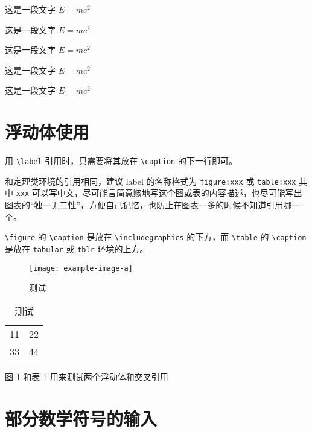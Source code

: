 \begin{antiexample}
  这是一段文字 $E = m c^2$
\end{antiexample}

\begin{conjecture}
  这是一段文字 $E = m c^2$
\end{conjecture}

\begin{question}
  这是一段文字 $E = m c^2$
\end{question}

\begin{claim}
  这是一段文字 $E = m c^2$
\end{claim}

\begin{remark}
  这是一段文字 $E = m c^2$
\end{remark}



\section{浮动体使用}

用 \verb|\label| 引用时，只需要将其放在 \verb|\caption| 的下一行即可。

和定理类环境的引用相同，建议 label 的名称格式为 \verb|figure:xxx| 或 \verb|table:xxx| 其中 \verb|xxx| 可以写中文，尽可能言简意赅地写这个图或表的内容描述，也尽可能写出图表的“独一无二性”，方便自己记忆，也防止在图表一多的时候不知道引用哪一个。

\verb|\figure| 的 \verb|\caption| 是放在 \verb|\includegraphics| 的下方，而 \verb|\table| 的 \verb|\caption| 是放在 \verb|tabular| 或 \verb|tblr| 环境的上方。

\begin{figure}[htbp]
  \centering
  \texttt{[image: example-image-a]}
  \caption{测试}
  \label{figure:test}
\end{figure}

\begin{table}[htbp]
  \centering
  \caption{测试}
  \label{table:test}
  \begin{tabular}{|c|c|}
    11 & 22 \\
    33 & 44 
  \end{tabular}
\end{table}

图 \ref{figure:test} 和表 \ref{table:test} 用来测试两个浮动体和交叉引用



\section{部分数学符号的输入}


